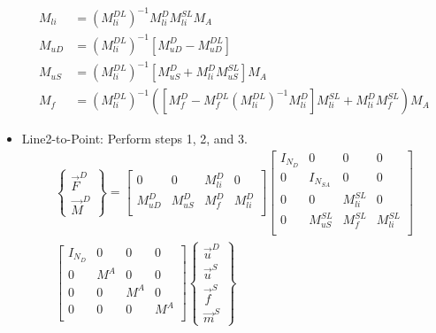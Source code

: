 \documentclass[10pt,letterpaper,oneside,notitlepage]{article}
\begin{document}
\begin{itemize}
\begin{multline}
			\end{multline}				
		\begin{align}
       M_{li} &= \left(M_{li}^{DL}\right)^{-1}M_{li}^D M_{li}^{SL} M_A \\ 
	     M_{uD} &= \left(M_{li}^{DL}\right)^{-1}\left[M_{uD}^D - M_{uD}^{DL}\right] \\
	     M_{uS} &= \left(M_{li}^{DL}\right)^{-1} \left[ M_{uS}^D + M_{li}^D M_{uS}^{SL}\right] M_A \\
	     M_{f}  &= \left(M_{li}^{DL}\right)^{-1}\left( \left[M_{f}^D - M_{f}^{DL}\left(M_{li}^{DL}\right)^{-1}M_{li}^D\right] M_{li}^{SL} +
	                      M_{li}^D M_{f}^{SL}  \right)M_A \end{align} 
	
	
  \item Line2-to-Point: Perform steps 1, 2, and 3.
			\begin{multline}
				\left\{	\begin{matrix} \vec{F}^{D} \\ \vec{M}^{D} \end{matrix} \right\} 
			  =
			  \begin{bmatrix}
				0 							 & 0  								 & M_{li}^{D} & 0          \\
				M_{uD}^{D} 		   & M_{uS}^{D}    		   & M_{f}^{D}  & M_{li}^{D} \\
				\end{bmatrix}				
				\begin{bmatrix}
				I_{N_D}					 & 0  								 & 0           & 0           \\
				0                & I_{\mathit{N_{SA}}} & 0   				 & 0   			 	 \\
				0								 & 0  								 & M_{li}^{SL} & 0   				 \\
				0							   & M_{uS}^{SL}    		 & M_{f}^{SL}  & M_{li}^{SL} \\
				\end{bmatrix}
				\\				
				\begin{bmatrix}
				I_{\mathit{N_D}} & 0   & 0   & 0   \\
				0 							 & M^A & 0   & 0   \\
				0 							 & 0   & M^A & 0   \\
				0								 & 0   & 0   & M^A \\
				\end{bmatrix}
				\left\{	\begin{matrix} \vec{u}^D \\ \vec{u}^{S}  \\ \vec{f}^{S}  \\ \vec{m}^{S} \end{matrix} \right\} 				

\end{multline}
\end{itemize}
\end{document}
